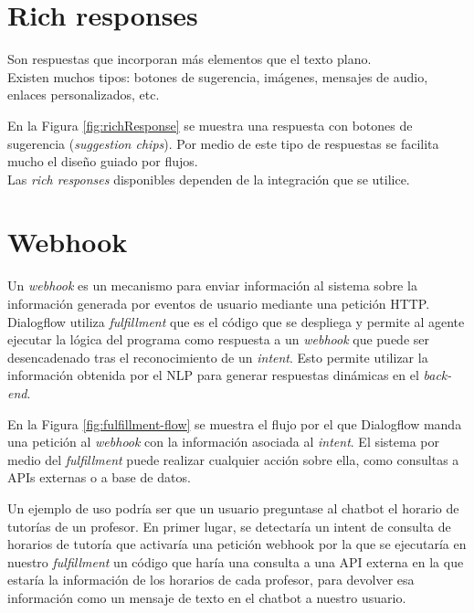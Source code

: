 \newpage

\section{Rich responses}

Son respuestas que incorporan más elementos que el texto plano.\\ 
Existen muchos tipos: botones de sugerencia, imágenes, mensajes de audio, enlaces personalizados, etc.


En la Figura \ref{fig:richResponse} se muestra una respuesta con botones de sugerencia (\textit{suggestion chips}). Por medio de este tipo de respuestas se facilita mucho el diseño guiado por flujos.\\
Las \textit{rich responses} disponibles dependen de la integración que se utilice.


\newpage

\section{Webhook}

Un \textit{webhook} es un mecanismo para enviar información al sistema sobre la información generada por eventos de usuario mediante una petición HTTP. \cite{Webhooks} \\

Dialogflow utiliza \textit{fulfillment} que es el código que se despliega y permite al agente ejecutar la lógica del programa como respuesta a un \textit{webhook} que puede ser desencadenado tras el reconocimiento de un \textit{intent}. Esto permite utilizar la información obtenida por el NLP para generar respuestas dinámicas en el \textit{back-end}. 



En la Figura \ref{fig:fulfillment-flow} se muestra el flujo por el que Dialogflow manda una petición al \textit{webhook} con la información asociada al \textit{intent}. El sistema por medio del \textit{fulfillment} puede realizar cualquier acción sobre ella, como consultas a APIs externas o a base de datos.

Un ejemplo de uso podría ser que un usuario preguntase al chatbot el horario de tutorías de un profesor. En primer lugar, se detectaría un intent de consulta de horarios de tutoría que activaría una petición webhook por la que se ejecutaría en nuestro \textit{fulfillment} un código que haría una consulta a una API externa en la que estaría la información de los horarios de cada profesor, para devolver esa información como un mensaje de texto en el chatbot a nuestro usuario.